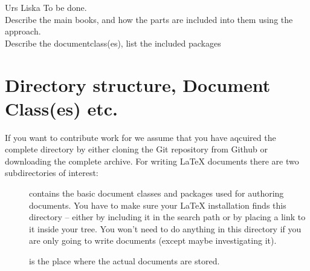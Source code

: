\documentclass[openLilyLib_CG]{subfiles}
\begin{document}

\begin{authorAbstract}{Urs Liska}
To be done.\\
Describe the main books, and how the parts are included into them using the  approach.\\
Describe the documentclass(es), list the included packages
\end{authorAbstract}

\chapter{Directory structure, Document Class(es) etc.}

If you want to contribute work for \openlilylib{} we assume that you have aqcuired the complete directory by either cloning the Git repository from Github or downloading the complete archive.
For writing \LaTeX{} documents there are two subdirectories of interest: 
\begin{description}
\item[] contains the basic document classes and packages used for authoring documents.
You have to make sure your \LaTeX{} installation finds this directory -- either by including it in the search path or by placing a link to it inside your  tree.
You won't need to do anything in this directory if you are only going to write documents (except maybe investigating it).
\item[] is the place where the actual documents are stored.
\end{description}
\end{document}

